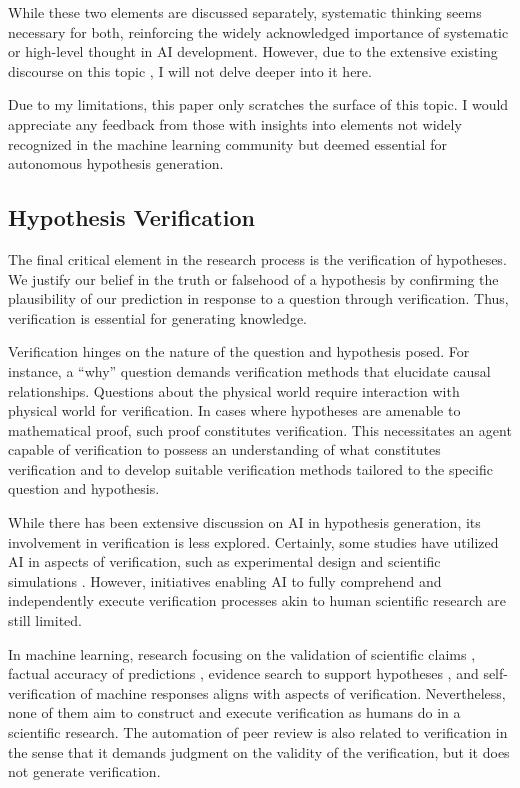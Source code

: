 \documentclass{article}
\begin{document}
While these two elements are discussed separately, systematic thinking seems necessary for both, reinforcing the widely acknowledged importance of systematic or high-level thought in AI development. However, due to the extensive existing discourse on this topic \cite{goyal2022inductive}, I will not delve deeper into it here.

Due to my limitations, this paper only scratches the surface of this topic. I would appreciate any feedback from those with insights into elements not widely recognized in the machine learning community but deemed essential for autonomous hypothesis generation.

\subsection{Hypothesis Verification}
\label{section-hypothesis-verification}
The final critical element in the research process is the verification of hypotheses. We justify our belief in the truth or falsehood of a hypothesis by confirming the plausibility of our prediction in response to a question through verification. Thus, verification is essential for generating knowledge.

Verification hinges on the nature of the question and hypothesis posed. For instance, a ``why'' question demands verification methods that elucidate causal relationships. Questions about the physical world require interaction with physical world for verification. In cases where hypotheses are amenable to mathematical proof, such proof constitutes verification. This necessitates an agent capable of verification to possess an understanding of what constitutes verification and to develop suitable verification methods tailored to the specific question and hypothesis.

While there has been extensive discussion on AI in hypothesis generation, its involvement in verification is less explored. Certainly, some studies have utilized AI in aspects of verification, such as experimental design \cite{chaloner1995bayesian} and scientific simulations \cite{baker2019basic}. However, initiatives enabling AI to fully comprehend and independently execute verification processes akin to human scientific research are still limited. 

In machine learning, research focusing on the validation of scientific claims \cite{wadden2020fact}, factual accuracy of predictions \cite{guo2022survey}, evidence search to support hypotheses \cite{koneru2023can}, and self-verification of machine responses \cite{dhuliawala2023chain} aligns with aspects of verification. Nevertheless, none of them aim to construct and execute verification as humans do in a scientific research. The automation of peer review \cite{kousha2022artificial,lin2021automated1} is also related to verification in the sense that it demands judgment on the validity of the verification, but it does not generate verification.
\end{document}
